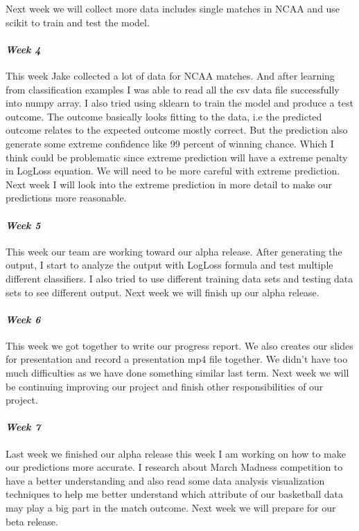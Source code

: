 \documentclass[onecolumn, draftclsnofoot,10pt, compsoc]{IEEEtran}
\begin{document}
Next week we will collect more data includes single matches in NCAA and use scikit to train and test the model.
\paragraph{\emph{Week 4}}
This week Jake collected a lot of data for NCAA matches. And after learning from classification examples I was able to read all the csv data file successfully into numpy array. I also tried using sklearn to train the model and produce a test outcome. The outcome basically looks fitting to the data, i.e the predicted outcome relates to the expected outcome mostly correct. But the prediction also generate some extreme confidence like 99 percent of winning chance. Which I think could be problematic since extreme prediction will have a extreme penalty in LogLoss equation. We will need to be more careful with extreme prediction. Next week I will look into the extreme prediction in more detail to make our predictions more reasonable.
\paragraph{\emph{Week 5}}
This week our team are working toward our alpha release. After generating the output, I start to analyze the output with LogLoss formula and test multiple different classifiers. I also tried to use different training data sets and testing data sets to see different output. Next week we will finish up our alpha release.
\paragraph{\emph{Week 6}}
This week we got together to write our progress report. We also creates our slides for presentation and record a presentation mp4 file together. We didn't have too much difficulties as we have done something similar last term. Next week we will be continuing improving our project and finish other responsibilities of our project.
\paragraph{\emph{Week 7}}
Last week we finished our alpha release this week I am working on how to make our predictions more accurate. I research about March Madness competition to have a better understanding and also read some data analysis visualization techniques to help me better understand which attribute of our basketball data may play a big part in the match outcome. Next week we will prepare for our beta release.
\end{document}
